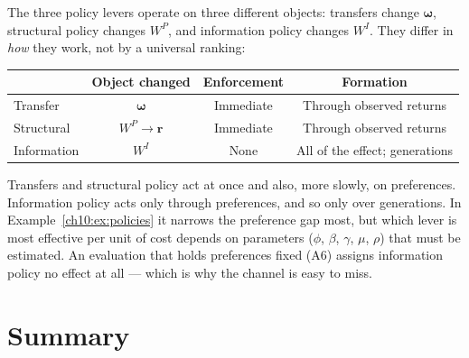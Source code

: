\documentclass[../structural_economics_book.tex]{subfiles}
\begin{document}
\begin{keyinsight}
The three policy levers operate on three different objects: transfers change $\boldsymbol{\omega}$, structural policy changes $W^P$, and information policy changes $W^I$. They differ in \textit{how} they work, not by a universal ranking:

\begin{center}
\begin{tabular}{lccc}
\toprule
& Object changed & Enforcement & Formation \\
\midrule
Transfer & $\boldsymbol{\omega}$ & Immediate & Through observed returns \\
Structural & $W^P \to \mathbf{r}$ & Immediate & Through observed returns \\
Information & $W^I$ & None & All of the effect; generations \\
\bottomrule
\end{tabular}
\end{center}

Transfers and structural policy act at once and also, more slowly, on preferences. Information policy acts only through preferences, and so only over generations. In Example~\ref{ch10:ex:policies} it narrows the preference gap most, but which lever is most effective per unit of cost depends on parameters ($\phi$, $\beta$, $\gamma$, $\mu$, $\rho$) that must be estimated. An evaluation that holds preferences fixed (A6) assigns information policy no effect at all --- which is why the channel is easy to miss.
\end{keyinsight}


\section{Summary}
\label{ch10:sec:summary}
\end{document}
